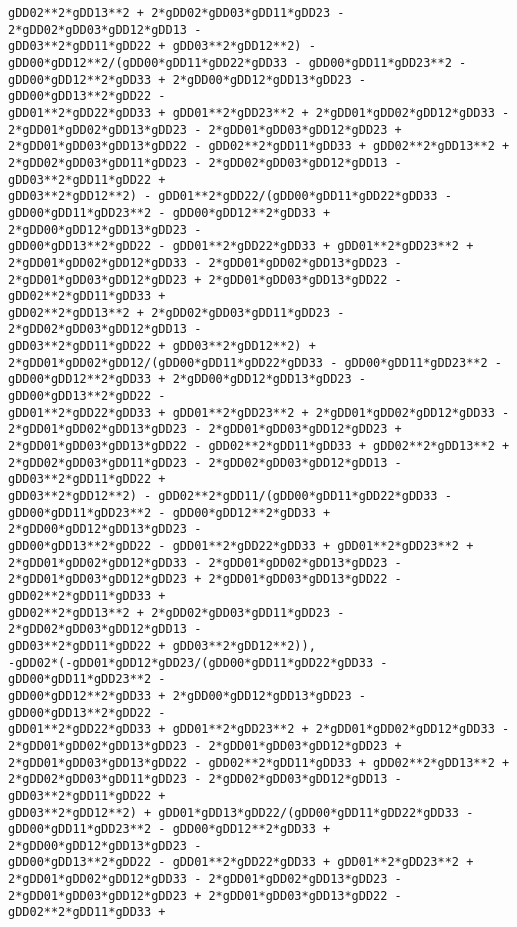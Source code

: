 \documentclass[landscape,letterpaper,10pt,english]{article}
\begin{document}
\begin{Verbatim}[commandchars=\\\{\}]
gDD02**2*gDD13**2 + 2*gDD02*gDD03*gDD11*gDD23 - 2*gDD02*gDD03*gDD12*gDD13 -
gDD03**2*gDD11*gDD22 + gDD03**2*gDD12**2) -
gDD00*gDD12**2/(gDD00*gDD11*gDD22*gDD33 - gDD00*gDD11*gDD23**2 -
gDD00*gDD12**2*gDD33 + 2*gDD00*gDD12*gDD13*gDD23 - gDD00*gDD13**2*gDD22 -
gDD01**2*gDD22*gDD33 + gDD01**2*gDD23**2 + 2*gDD01*gDD02*gDD12*gDD33 -
2*gDD01*gDD02*gDD13*gDD23 - 2*gDD01*gDD03*gDD12*gDD23 +
2*gDD01*gDD03*gDD13*gDD22 - gDD02**2*gDD11*gDD33 + gDD02**2*gDD13**2 +
2*gDD02*gDD03*gDD11*gDD23 - 2*gDD02*gDD03*gDD12*gDD13 - gDD03**2*gDD11*gDD22 +
gDD03**2*gDD12**2) - gDD01**2*gDD22/(gDD00*gDD11*gDD22*gDD33 -
gDD00*gDD11*gDD23**2 - gDD00*gDD12**2*gDD33 + 2*gDD00*gDD12*gDD13*gDD23 -
gDD00*gDD13**2*gDD22 - gDD01**2*gDD22*gDD33 + gDD01**2*gDD23**2 +
2*gDD01*gDD02*gDD12*gDD33 - 2*gDD01*gDD02*gDD13*gDD23 -
2*gDD01*gDD03*gDD12*gDD23 + 2*gDD01*gDD03*gDD13*gDD22 - gDD02**2*gDD11*gDD33 +
gDD02**2*gDD13**2 + 2*gDD02*gDD03*gDD11*gDD23 - 2*gDD02*gDD03*gDD12*gDD13 -
gDD03**2*gDD11*gDD22 + gDD03**2*gDD12**2) +
2*gDD01*gDD02*gDD12/(gDD00*gDD11*gDD22*gDD33 - gDD00*gDD11*gDD23**2 -
gDD00*gDD12**2*gDD33 + 2*gDD00*gDD12*gDD13*gDD23 - gDD00*gDD13**2*gDD22 -
gDD01**2*gDD22*gDD33 + gDD01**2*gDD23**2 + 2*gDD01*gDD02*gDD12*gDD33 -
2*gDD01*gDD02*gDD13*gDD23 - 2*gDD01*gDD03*gDD12*gDD23 +
2*gDD01*gDD03*gDD13*gDD22 - gDD02**2*gDD11*gDD33 + gDD02**2*gDD13**2 +
2*gDD02*gDD03*gDD11*gDD23 - 2*gDD02*gDD03*gDD12*gDD13 - gDD03**2*gDD11*gDD22 +
gDD03**2*gDD12**2) - gDD02**2*gDD11/(gDD00*gDD11*gDD22*gDD33 -
gDD00*gDD11*gDD23**2 - gDD00*gDD12**2*gDD33 + 2*gDD00*gDD12*gDD13*gDD23 -
gDD00*gDD13**2*gDD22 - gDD01**2*gDD22*gDD33 + gDD01**2*gDD23**2 +
2*gDD01*gDD02*gDD12*gDD33 - 2*gDD01*gDD02*gDD13*gDD23 -
2*gDD01*gDD03*gDD12*gDD23 + 2*gDD01*gDD03*gDD13*gDD22 - gDD02**2*gDD11*gDD33 +
gDD02**2*gDD13**2 + 2*gDD02*gDD03*gDD11*gDD23 - 2*gDD02*gDD03*gDD12*gDD13 -
gDD03**2*gDD11*gDD22 + gDD03**2*gDD12**2)),
-gDD02*(-gDD01*gDD12*gDD23/(gDD00*gDD11*gDD22*gDD33 - gDD00*gDD11*gDD23**2 -
gDD00*gDD12**2*gDD33 + 2*gDD00*gDD12*gDD13*gDD23 - gDD00*gDD13**2*gDD22 -
gDD01**2*gDD22*gDD33 + gDD01**2*gDD23**2 + 2*gDD01*gDD02*gDD12*gDD33 -
2*gDD01*gDD02*gDD13*gDD23 - 2*gDD01*gDD03*gDD12*gDD23 +
2*gDD01*gDD03*gDD13*gDD22 - gDD02**2*gDD11*gDD33 + gDD02**2*gDD13**2 +
2*gDD02*gDD03*gDD11*gDD23 - 2*gDD02*gDD03*gDD12*gDD13 - gDD03**2*gDD11*gDD22 +
gDD03**2*gDD12**2) + gDD01*gDD13*gDD22/(gDD00*gDD11*gDD22*gDD33 -
gDD00*gDD11*gDD23**2 - gDD00*gDD12**2*gDD33 + 2*gDD00*gDD12*gDD13*gDD23 -
gDD00*gDD13**2*gDD22 - gDD01**2*gDD22*gDD33 + gDD01**2*gDD23**2 +
2*gDD01*gDD02*gDD12*gDD33 - 2*gDD01*gDD02*gDD13*gDD23 -
2*gDD01*gDD03*gDD12*gDD23 + 2*gDD01*gDD03*gDD13*gDD22 - gDD02**2*gDD11*gDD33 +

\end{Verbatim}
\end{document}
